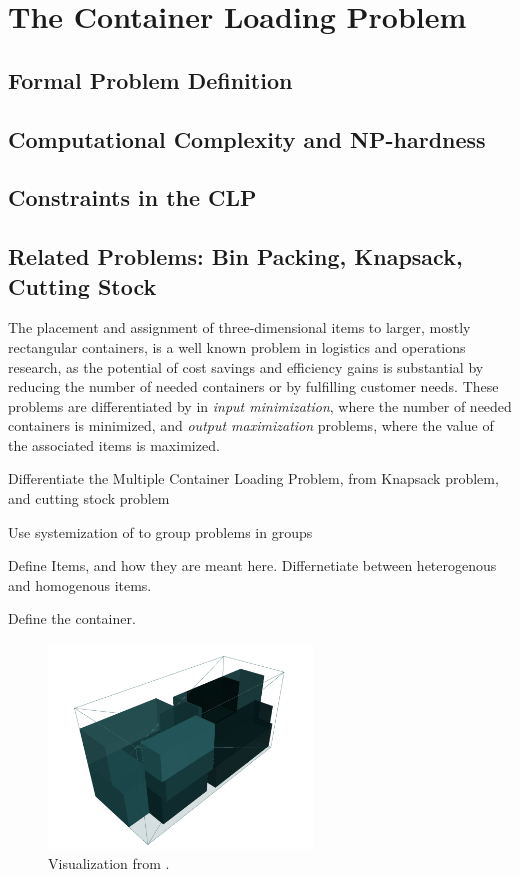 \chapter{The Container Loading Problem}
\section{Formal Problem Definition}
\section{Computational Complexity and NP-hardness}
\section{Constraints in the CLP}
\section{Related Problems: Bin Packing, Knapsack, Cutting Stock}

The placement and assignment of three-dimensional items to larger, mostly rectangular
containers, is a well known problem in logistics and operations research, as the
potential of cost savings and efficiency gains is substantial by reducing the number
of needed containers or by fulfilling customer needs. These problems are differentiated
by \cite{bortfeldt_constraints_2013} in \textit{input minimization}, where the number
of needed containers is minimized, and \textit{output maximization} problems, where the
value of the associated items is maximized.

Differentiate the Multiple Container Loading Problem, from Knapsack problem,
and cutting stock problem \parencite{bortfeldt_constraints_2013}

Use systemization of \parencite{bortfeldt_constraints_2013} to group problems in
groups

Define Items, and how they are meant here. Differnetiate between heterogenous
and homogenous items.

Define the container.

\begin{figure}[H]
    \centering
    \includegraphics[width=7cm]{pictures/3l_cvrp_example.png}
    \caption{Visualization from \cite{tamke_branch-and-cut_2024}.}
    \label{fig:solution-visualization}
\end{figure}